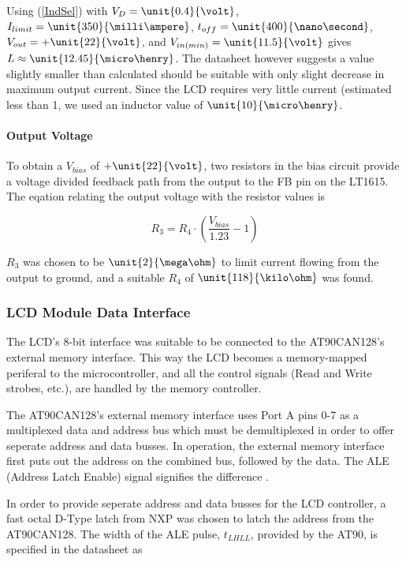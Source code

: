 Using (\ref{IndSel}) with $V_{D}=\unit{0.4}{\volt}$, $I_{limit}=\unit{350}{\milli\ampere}$, $t_{off}=\unit{400}{\nano\second}$, $V_{out}=+\unit{22}{\volt}$, and $V_{in(min)}=\unit{11.5}{\volt}$ gives $L\approx\unit{12.45}{\micro\henry}$. The datasheet however suggests a value slightly smaller than calculated should be suitable with only slight decrease in maximum output current. Since the LCD requires very little current (estimated less than \unit{1}{\milli\ampere}, we used an inductor value of $\unit{10}{\micro\henry}$.


\paragraph{Output Voltage}

To obtain a $V_{bias}$ of $+\unit{22}{\volt}$, two resistors in the bias circuit provide a voltage divided feedback path from the output to the FB pin on the LT1615. The eqation relating the output voltage with the resistor values is

\begin{equation}
R_{3}=R_{4}\cdot\left(\frac{V_{bias}}{1.23}-1\right)
\end{equation}

 $R_{3}$ was chosen to be $\unit{2}{\mega\ohm}$ to limit current flowing from the output to ground, and a suitable $R_{4}$ of $\unit{118}{\kilo\ohm}$ was found.


\subsubsection{LCD Module Data Interface\label{sec:lcd_module_data_interface}}

The LCD's 8-bit interface was suitable to be connected to the AT90CAN128's external memory interface. This way the LCD becomes a memory-mapped periferal to the microcontroller, and all the control signals (Read and Write strobes, etc.), are handled by the memory controller.

The AT90CAN128's external memory interface uses Port A pins 0-7 as a multiplexed data and address bus which must be demultiplexed in order to offer seperate address and data busses. In operation, the external memory interface first puts out the address on the combined bus, followed by the data. The ALE (Address Latch Enable) signal signifies the difference \cite{AT90CAN}.

In order to provide seperate address and data busses for the LCD controller, a fast octal D-Type latch from NXP was chosen to latch the address from the AT90CAN128. The width of the ALE pulse, $t_{LHLL}$, provided by the AT90, is specified in the datasheet as

